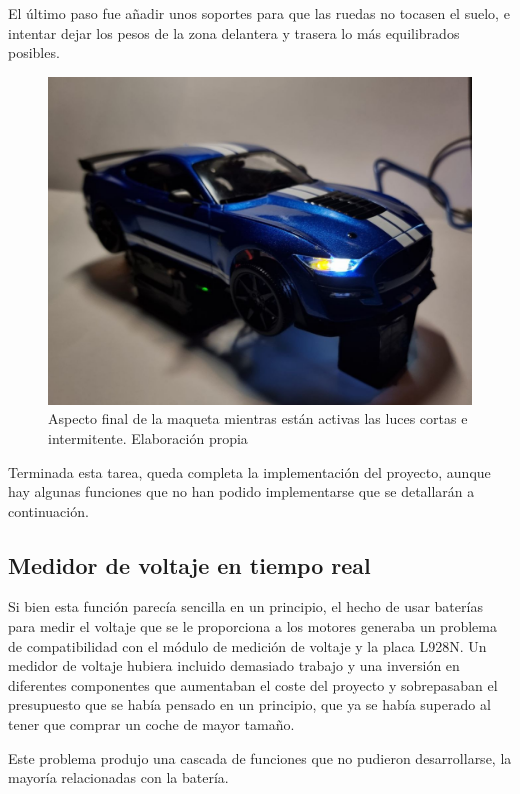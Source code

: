 El último paso fue añadir unos soportes para que las ruedas no tocasen el suelo, e intentar dejar los pesos de la zona delantera y trasera lo más equilibrados posibles. 
\begin{figure}[H]
    \centering
    \includegraphics[width=1\textwidth]{imagenes/montaje/maqueta_final.jpg}
    \caption{Aspecto final de la maqueta mientras están activas las luces cortas e intermitente. Elaboración propia}
\end{figure}



Terminada esta tarea, queda completa la implementación del proyecto, aunque hay algunas funciones que no han podido implementarse que se detallarán a continuación.

\subsection*{Medidor de voltaje en tiempo real}

Si bien esta función parecía sencilla en un principio, el hecho de usar baterías para medir el voltaje que se le proporciona a los motores generaba un problema de compatibilidad con el módulo de medición de voltaje y la placa L928N. Un medidor de voltaje hubiera incluido demasiado trabajo y una inversión en diferentes componentes que aumentaban el coste del proyecto y sobrepasaban el presupuesto que se había pensado en un principio, que ya se había superado al tener que comprar un coche de mayor tamaño. 

Este problema produjo una cascada de funciones que no pudieron desarrollarse, la mayoría relacionadas con la batería.

